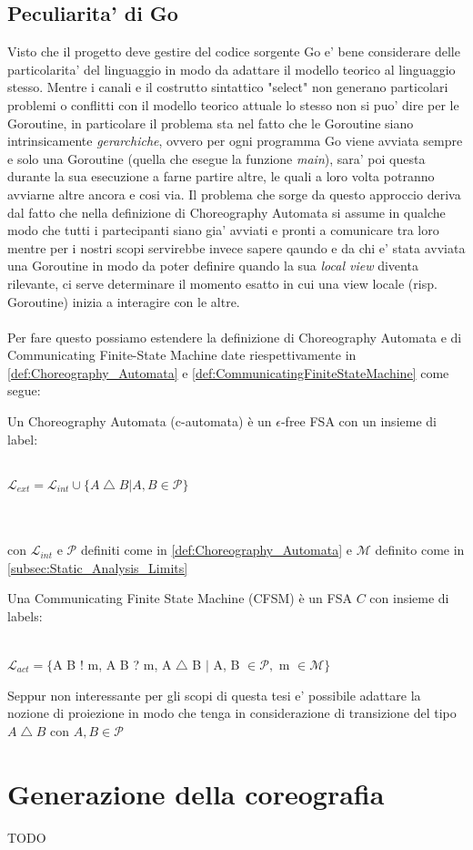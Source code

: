 \subsection{Peculiarita' di Go}
Visto che il progetto deve gestire del codice sorgente Go e' bene considerare delle particolarita' del linguaggio in modo da adattare il modello teorico al linguaggio stesso. 
Mentre i canali e il costrutto sintattico "select" non generano particolari problemi o conflitti con il modello teorico attuale lo stesso non si puo' dire per le Goroutine, in particolare il problema sta nel fatto che le Goroutine siano intrinsicamente \emph{gerarchiche}, ovvero per ogni programma Go viene avviata sempre e solo una Goroutine (quella che esegue la funzione \emph{main}), sara' poi questa durante la sua esecuzione a farne partire altre, le quali a loro volta potranno avviarne altre ancora e cosi via.
Il problema che sorge da questo approccio deriva dal fatto che nella definizione di Choreography Automata si assume in qualche modo che tutti i partecipanti siano gia' avviati e pronti a comunicare tra loro mentre per i nostri scopi servirebbe invece sapere qaundo e da chi e' stata avviata una Goroutine in modo da poter definire quando la sua \emph{local view} diventa rilevante, ci serve determinare il momento esatto in cui una view locale (risp. Goroutine) inizia a interagire con le altre.\\ \\
Per fare questo possiamo estendere la definizione di Choreography Automata e di Communicating Finite-State Machine date riespettivamente in \ref{def:Choreography_Automata} e \ref{def:CommunicatingFiniteStateMachine} come segue:

\begin{definition}
    Un Choreography Automata (c-automata) è un $\epsilon$-free FSA con un insieme di label:\\ \\
    \centerline{$\mathcal{L}_{ext} = \mathcal{L}_{int} \cup \{ A \bigtriangleup B | A, B \in \mathcal{P}\}$}\\ \\
    con $\mathcal{L}_{int}$ e $\mathcal{P}$ definiti come in \ref{def:Choreography_Automata} e $\mathcal{M}$ definito come in \ref{subsec:Static_Analysis_Limits}
\end{definition}

\begin{definition}
    Una Communicating Finite State Machine (CFSM) è un FSA $C$ con insieme di labels:
    \\ \\
    \centerline{$\mathcal{L}_{act} = \{$A B ! m, A B ? m, A $\bigtriangleup$ B $|$ A, B $ \in \mathcal{P},$ m $ \in \mathcal{M}\}$}
\end{definition}

\begin{remark}
    Seppur non interessante per gli scopi di questa tesi e' possibile adattare la nozione di proiezione in modo che tenga in considerazione di transizione del tipo $A \bigtriangleup B$ con $A, B \in \mathcal{P}$
\end{remark}

\section{Generazione della coreografia}
TODO %
